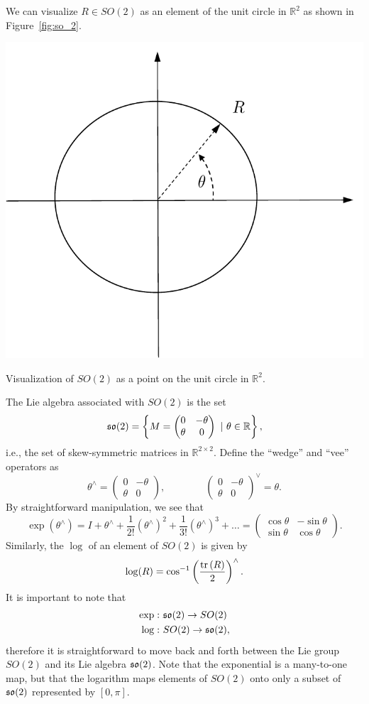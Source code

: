 We can visualize $R\in SO(2)$ as an element of the unit circle in $\mathbb{R}^2$ as shown in Figure~\ref{fig:so_2}.
\begin{marginfigure}
  \centering\includegraphics[width=\linewidth]{./chap2_preliminaries/figures/so_2}
  \caption{Visualization of $SO(2)$ as a point on the unit circle in $\mathbb{R}^2$.}
  \label{fig:so_2}  
\end{marginfigure}
The Lie algebra associated with $SO(2)$ is the set
\[
\mathfrak{so}(2) = \left\{ M = \begin{pmatrix} 0 & -\theta \\ \theta & 0 \end{pmatrix} ~|~ \theta\in\mathbb{R} \right\},
\]
i.e., the set of skew-symmetric matrices in $\mathbb{R}^{2\times 2}$.  Define the ``wedge'' and ``vee'' operators as
\[
\theta^\wedge = \begin{pmatrix} 0 & -\theta \\ \theta & 0 \end{pmatrix},
\qquad \qquad
\begin{pmatrix} 0 & -\theta \\ \theta & 0 \end{pmatrix}^\vee = \theta.
\]
By straightforward manipulation, we see that 
\[
\exp(\theta^\wedge) = I + \theta^\wedge + \frac{1}{2!}(\theta^\wedge)^2 + \frac{1}{3!}(\theta^\wedge)^3 + \dots 
= \begin{pmatrix} \cos\theta & -\sin\theta \\ \sin\theta & \cos\theta \end{pmatrix}.
\]
Similarly, the $\log$ of an element of $SO(2)$ is given by
\[
\log(R) = \cos^{-1}\left(\frac{\text{tr}\left(R\right)}{2}\right)^\wedge.
\]
It is important to note that 
\begin{align*}
\exp: &~ \mathfrak{so}(2) \to SO(2) \\	
\log: &~ SO(2) \to \mathfrak{so}(2),
\end{align*}
therefore it is straightforward to move back and forth between the Lie group $SO(2)$ and its Lie algebra $\mathfrak{so}(2)$.  Note that the exponential is a many-to-one map, but that the logarithm maps elements of $SO(2)$ onto only a subset of $\mathfrak{so}(2)$ represented by $[0,\pi]$.

